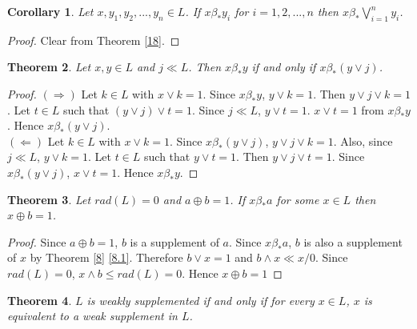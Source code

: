 \documentclass[a4paper,12pt]{article}
\newtheorem{theorem}{Theorem}[section]
\newtheorem{corollary}[theorem]{Corollary}
\numberwithin{equation}{section}
\begin{document}
\begin{corollary}\label{19}
  Let $ x, y_1, y_2,...,y_n \in L $. If $ x \beta_* y_i $ for $ i=1,2,...,n $ then $ \displaystyle x \beta_* \bigvee_{i=1}^n y_i $.
\end{corollary}
\begin{proof}
  Clear from Theorem \ref{18}.
\end{proof}

\begin{theorem}\label{20}
  Let $ x,y \in L $ and $ j \ll L $. Then $ x \beta_* y $ if and only if $ x \beta_* ( y \vee j ) $.
\end{theorem}

\begin{proof}
  $ ( \Rightarrow ) $ 
  Let $ k \in L $ with $ x \vee k = 1 $. Since $ x \beta_* y $, $ y \vee k = 1 $. Then $ y \vee j \vee k = 1 $. 
  Let $ t \in L $ such that $ ( y \vee j ) \vee t = 1 $. Since $ j \ll L $, $ y \vee t = 1 $. $ x \vee t = 1 $ from $ x \beta_* y $. 
  Hence $ x \beta_* ( y \vee j ) $. \\
  $( \Leftarrow ) $ 
  Let $ k \in L $ with $ x \vee k = 1 $. Since $ x \beta_* ( y \vee j ) $, $ y \vee j \vee k = 1 $. Also, since $ j \ll L $, $ y \vee k = 1 $. 
  Let $ t \in L $ such that $ y \vee t = 1 $. Then $ y \vee j \vee t = 1 $. Since $ x \beta_* ( y \vee j ) $, $ x \vee t = 1 $. Hence $ x \beta_* y $.

\end{proof}

\begin{theorem}\label{21}
  Let $ rad(L)=0 $ and $ a \oplus b = 1 $. If $ x \beta_* a $ for some $ x \in L $ then $ x \oplus b = 1 $. 
\end{theorem}
\begin{proof}
  Since $ a \oplus b = 1 $, $ b $ is a supplement of $ a $. 
  Since $ x \beta_* a $, $ b $ is also a supplement of $ x $ by Theorem \ref{8} \ref{8.1}. 
  Therefore $ b \vee x = 1 $ and 
  $ b \wedge x \ll x/0 $. Since $ rad(L)=0 $, $ x \wedge b \leq rad(L) = 0 $. Hence $ x \oplus b = 1 $
\end{proof}

\begin{theorem}
  $ L $ is weakly supplemented if and only if for every $ x \in L $, $ x $ is equivalent to a weak supplement in $ L $.
\end{theorem}
\end{document}
